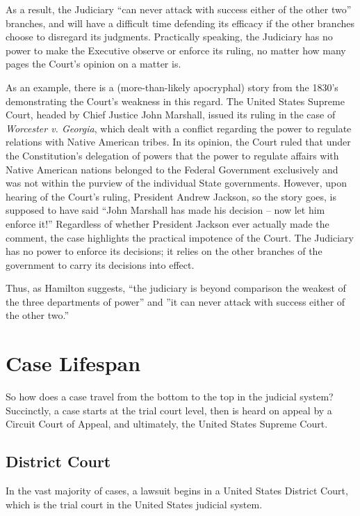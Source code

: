 As a result, the Judiciary ``can never attack with success either of the other two'' branches, and will have a difficult time defending its efficacy if the other branches choose to disregard its judgments.
Practically speaking, the Judiciary has no power to make the Executive observe or enforce its ruling, no matter how many pages the Court's opinion on a matter is.

As an example, there is a (more-than-likely apocryphal) story from the 1830's demonstrating the Court's weakness in this regard.  The United States Supreme Court, headed by Chief Justice John Marshall, issued its ruling in the case of \textit{Worcester v. Georgia}, which dealt with a conflict regarding the power to regulate relations with Native American tribes.  In its opinion, the Court ruled that under the Constitution's delegation of powers that the power to regulate affairs with Native American nations belonged to the Federal Government exclusively and was not within the purview of the individual State governments.  However, upon hearing of the Court's ruling, President Andrew Jackson, so the story goes, is supposed to have said “John Marshall has made his decision -- now let him enforce it!”
Regardless of whether President Jackson ever actually made the comment, the case highlights the practical impotence of the Court.  The Judiciary has no power to enforce its decisions; it relies on the other branches of the government to carry its decisions into effect.

Thus, as Hamilton suggests, ``the judiciary is beyond comparison the weakest of the three departments of power'' and ''it can never attack with success either of the other two.''


\section{Case Lifespan}
So how does a case travel from the bottom to the top in the judicial system?  Succinctly, a case starts at the trial court level, then is heard on appeal by a Circuit Court of Appeal, and ultimately, the United States Supreme Court.


\subsection{District Court}
In the vast majority of cases, a lawsuit begins in a United States District Court, which is the trial court in the United States judicial system.

